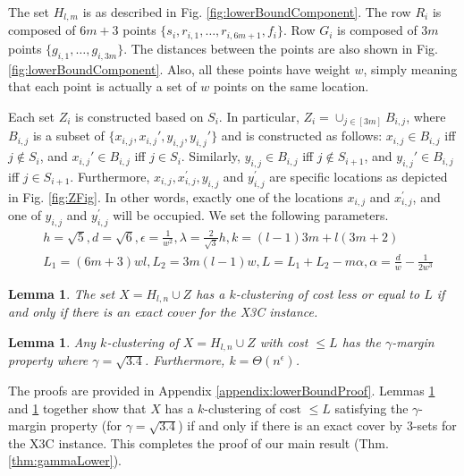 \documentclass[12pt]{article}
\newtheorem{lemma}[theorem]{Lemma}
\begin{document}
The set $H_{l,m}$ is as described in Fig. \ref{fig:lowerBoundComponent}. The row $R_i$ is composed of $6m + 3$ points $\{s_i, r_{i, 1}, \ldots, r_{i, 6m+1}, f_i\}$. Row $G_i$ is composed of $3m$ points $\{g_{i,1}, \ldots, g_{i, 3m}\}$. The distances between the points are also shown in Fig. \ref{fig:lowerBoundComponent}. Also, all these points have weight $w$, simply meaning that each point is actually a set of $w$ points on the same location.

Each set $Z_i$ is constructed based on $S_i$. In particular, $Z_i = \cup_{j\in [3m]} B_{i,j}$, where $B_{i,j}$ is a subset of $\{x_{i,j},x_{i,j}',y_{i,j},y_{i,j}'\}$ and is constructed as follows: $x_{i,j} \in B_{i,j}$ iff $j \not\in S_i$, and $x_{i,j}' \in B_{i,j}$ iff $j \in S_i$. Similarly,  $y_{i,j} \in B_{i,j}$ iff $j \not\in S_{i+1}$, and $y_{i,j}' \in B_{i,j}$ iff $j \in S_{i+1}$. Furthermore, $x_{i, j}, x_{i,j}^\prime, y_{i,j}$ and $y_{i, j}^\prime$ are specific locations as depicted in Fig. \ref{fig:ZFig}. In other words, exactly one of the locations $x_{i,j}$ and $x_{i,j}^\prime$, and one of $y_{i,j}$ and $y_{i,j}^\prime$ will be occupied. We set the following parameters. 
\vspace{-0.1in}
\begin{align*}
&h = \sqrt{5}, d = \sqrt{6}, \epsilon = \frac{1}{w^2}, \lambda = \frac{2}{\sqrt{3}}h, k = (l-1)3m + l(3m+2)\\
& L_1 = (6m+3)wl, L_2 = 3m(l-1)w, L = L_1 + L_2 - m\alpha, \alpha = \frac{d}{w}-\frac{1}{2w^3}
\end{align*}


\begin{lemma}
\label{lemma:kmeansEquivalenceX3C}
The set $X = H_{l,n} \cup Z$ has a $k$-clustering of cost less or equal to $L$ if and only if there is an exact cover for the X3C instance.
\end{lemma}

\begin{lemma}
\label{lemma:gammaLower}
Any $k$-clustering of $X = H_{l,n} \cup Z$ with cost $\le L$ has the $\gamma$-margin property where $\gamma = \sqrt{3.4}$. Furthermore, $k = \Theta(n^{\epsilon})$.
\end{lemma}

The proofs are provided in Appendix \ref{appendix:lowerBoundProof}. Lemmas \ref{lemma:kmeansEquivalenceX3C} and \ref{lemma:gammaLower} together show that $X$ has a $k$-clustering of cost $\le L$ satisfying the $\gamma$-margin property (for $\gamma = \sqrt{3.4}$) if and only if there is an exact cover by $3$-sets for the X3C instance. This completes the proof of our main result (Thm. \ref{thm:gammaLower}). 
\end{document}
